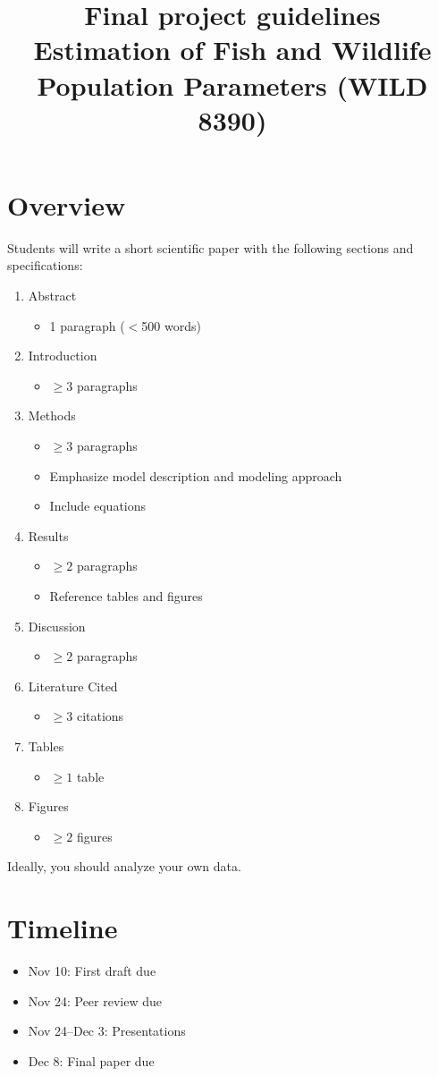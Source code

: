 \documentclass[12pt]{article}
\title{Final project guidelines \\ Estimation of Fish and Wildlife Population Parameters (WILD 8390)}
\date{}
\begin{document}
\maketitle

\section*{Overview}

Students will write a short scientific paper with the following sections and specifications:
\begin{enumerate}
  \item Abstract
  \begin{itemize}
    \item 1 paragraph ($<$500 words)
  \end{itemize}
  \item Introduction
  \begin{itemize}
    \item $\ge 3$ paragraphs
  \end{itemize}
  \item Methods
  \begin{itemize}
    \item $\ge 3$ paragraphs
    \item Emphasize model description and modeling approach
    \item Include equations
  \end{itemize}
  \item Results
  \begin{itemize}
    \item $\ge 2$ paragraphs
    \item Reference tables and figures
  \end{itemize}
  \item Discussion
  \begin{itemize}
    \item $\ge 2$ paragraphs
  \end{itemize}
  \item Literature Cited
  \begin{itemize}
    \item $\ge 3$ citations
  \end{itemize}
  \item Tables
  \begin{itemize}
    \item $\ge 1$ table
  \end{itemize}
  \item Figures
  \begin{itemize}
    \item $\ge 2$ figures
  \end{itemize}
\end{enumerate}

Ideally, you should analyze your own data.

\section*{Timeline}

\begin{itemize}
  \item Nov 10: First draft due
  \item Nov 24: Peer review due
  \item Nov 24--Dec 3: Presentations
  \item Dec 8: Final paper due
\end{itemize}
\end{document}
